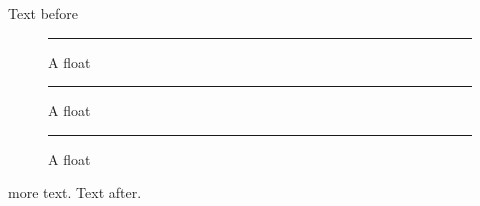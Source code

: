 \documentclass{article}
\newcommand\fig{\begin{figure}[htbp]\centering
  \rule{1cm}{\pdfuniformdeviate 500pt}\caption{A float}\end{figure}}
\begin{document}
Text before \fig\fig\fig more text.\hfill\pagebreak
Text after.
\gdef\SatexReachedEnd{}
\end{document}

